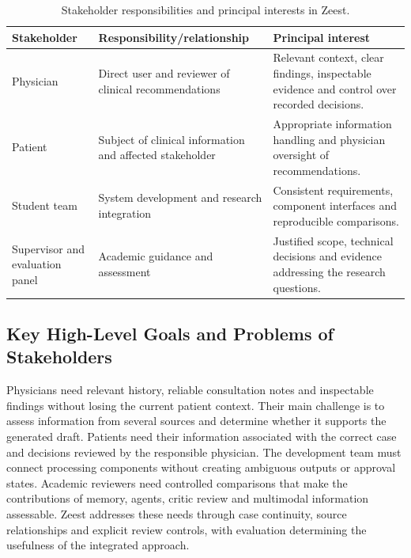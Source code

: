 \begin{table}[htbp]
\centering
\small
\caption{Stakeholder responsibilities and principal interests in Zeest.}
\label{tab:kashaf:stakeholders}
\begin{tabular}{|p{}|p{}|p{}|}
\hline
Stakeholder & Responsibility/relationship & Principal interest \\ \hline
Physician & Direct user and reviewer of clinical recommendations & Relevant context, clear findings, inspectable evidence and control over recorded decisions. \\ \hline
Patient & Subject of clinical information and affected stakeholder & Appropriate information handling and physician oversight of recommendations. \\ \hline
Student team & System development and research integration & Consistent requirements, component interfaces and reproducible comparisons. \\ \hline
Supervisor and evaluation panel & Academic guidance and assessment & Justified scope, technical decisions and evidence addressing the research questions. \\ \hline
\end{tabular}
\end{table}

\clearpage
\subsection{Key High-Level Goals and Problems of Stakeholders}

Physicians need relevant history, reliable consultation notes and inspectable findings without losing the current patient context. Their main challenge is to assess information from several sources and determine whether it supports the generated draft. Patients need their information associated with the correct case and decisions reviewed by the responsible physician. The development team must connect processing components without creating ambiguous outputs or approval states. Academic reviewers need controlled comparisons that make the contributions of memory, agents, critic review and multimodal information assessable. Zeest addresses these needs through case continuity, source relationships and explicit review controls, with evaluation determining the usefulness of the integrated approach.

\endgroup
